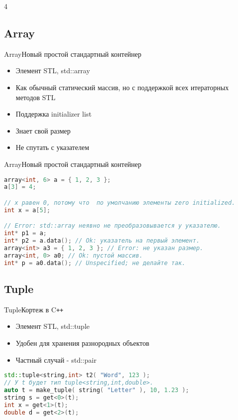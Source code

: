 4\documentclass[10pt]{beamer}
\begin{document}
\subsection{Array}
\hypertarget{Array}{}
\begin{frame}[fragile]{Array}{Новый простой стандартный контейнер}
 \begin{itemize}
 \item{Элемент STL, std::array}
 \item{Как обычный статический массив, но с поддержкой всех итераторных методов STL}
 \item{Поддержка initializer list}
 \item{Знает свой размер}
 \item{Не спутать с указателем}
  \end{itemize}
\end{frame}

\begin{frame}[fragile]{Array}{Новый простой стандартный контейнер}
\begin{lstlisting}[language=C++]
array<int, 6> a = { 1, 2, 3 };
a[3] = 4;

// x равен 0, потому что  по умолчанию элементы zero initialized.
int x = a[5]; 

// Error: std::array неявно не преобразовывается у указателю.
int* p1 = a; 
int* p2 = a.data(); // Ok: указатель на первый элемент.
array<int> a3 = { 1, 2, 3 }; // Error: не указан размер.
array<int, 0> a0; // Ok: пустой массив.
int* p = a0.data(); // Unspecified; не делайте так.
\end{lstlisting}
\end{frame}


\subsection{Tuple}
\hypertarget{Tuple}{}
\begin{frame}[fragile]{Tuple}{Кортеж в C\texttt{++}}
\begin{itemize}
\item{Элемент STL, std::tuple}
 \item{Удобен для хранения разнородных объектов}
 \item{Частный случай - std::pair}
\end{itemize}
\vspace{5mm}
\begin{lstlisting}[language=C++]
std::tuple<string,int> t2( "Word", 123 );
// У t будет тип tuple<string,int,double>.
auto t = make_tuple( string( "Letter" ), 10, 1.23 );	
string s = get<0>(t);
int x = get<1>(t);
double d = get<2>(t);
\end{lstlisting}
\end{frame}
\end{document}
